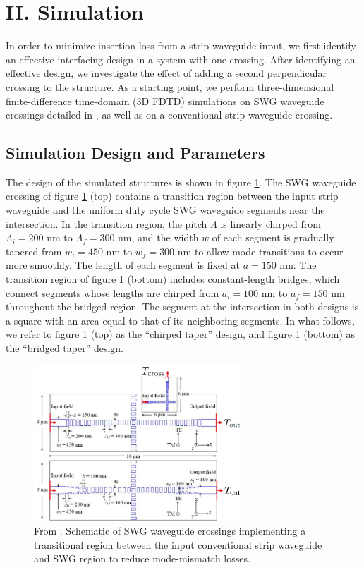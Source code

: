 \documentclass[aps,prl,twocolumn, superscriptaddress]{revtex4}
\begin{document}
\vspace{-1em}
\section{II. Simulation}
\vspace{-1em}
In order to minimize insertion loss from a strip waveguide input, we first identify an effective interfacing design in a system with one crossing. After identifying an effective design, we investigate the effect of adding a second perpendicular crossing to the structure. As a starting point, we perform three-dimensional finite-difference time-domain (3D FDTD) simulations on SWG waveguide crossings detailed in \cite{BockPaper}, as well as on a conventional strip waveguide crossing. 

\vspace{-1em}
\subsection{Simulation Design and Parameters}

The design of the simulated structures is shown in figure \ref{fig:Bock}. The SWG waveguide crossing of figure \ref{fig:Bock} (top) contains a transition region between the input strip waveguide and the uniform duty cycle SWG waveguide segments near the intersection. In the transition region, the pitch $\Lambda$ is linearly chirped from $\Lambda_i = 200$ nm to $\Lambda_f = 300$ nm, and the width $w$ of each segment is gradually tapered from $w_i = 450$ nm to $w_f = 300$ nm to allow mode transitions to occur more smoothly. The length of each segment is fixed at $a=150$ nm. The transition region of figure \ref{fig:Bock} (bottom) includes constant-length bridges, which connect segments whose lengths are chirped from $a_i = 100$ nm to $a_f = 150$ nm throughout the bridged region. The segment at the intersection in both designs is a square with an area equal to that of its neighboring segments. In what follows, we refer to figure \ref{fig:Bock} (top) as the ``chirped taper'' design, and figure \ref{fig:Bock} (bottom) as the ``bridged taper'' design. 
 \begin{figure}[!h]
    \centering
    \includegraphics[width=7.8cm]{bock_cross.png}
    \caption{From \cite{BockPaper}. Schematic of SWG waveguide crossings implementing a transitional region between the input conventional strip waveguide and SWG region to reduce mode-mismatch losses.}
    \label{fig:Bock}
\end{figure}
\end{document}
